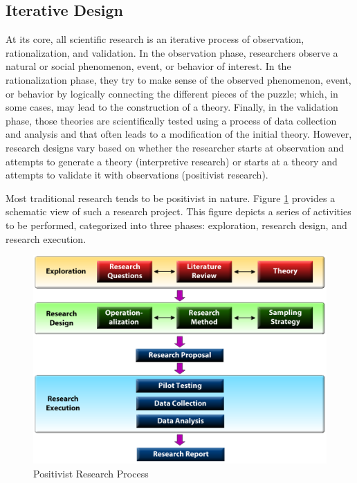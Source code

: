 \subsection{Iterative Design}

At its core, all scientific research is an iterative process of observation, rationalization, and validation. In the observation phase, researchers observe a natural or social phenomenon, event, or behavior of interest. In the rationalization phase, they try to make sense of the observed phenomenon, event, or behavior by logically connecting the different pieces of the puzzle; which, in some cases, may lead to the construction of a theory. Finally, in the validation phase, those theories are scientifically tested using a process of data collection and analysis and that often leads to a modification of the initial theory. However, research designs vary based on whether the researcher starts at observation and attempts to generate a theory (interpretive research) or starts at a theory and attempts to validate it with observations (positivist research).

Most traditional research tends to be positivist in nature. Figure \ref{fig04.01} provides a schematic view of such a research project. This figure depicts a series of activities to be performed, categorized into three phases: exploration, research design, and research execution. 

\begin{figure}[H]
	\centering
	\includegraphics[width=\linewidth]{gfx/04-01}
	\caption{Positivist Research Process}
	\label{fig04.01}
\end{figure}

